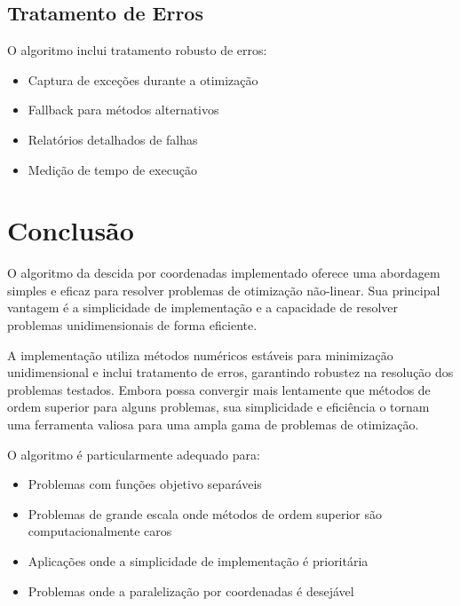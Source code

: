 \documentclass[12pt]{article}
\begin{document}
\subsection{Tratamento de Erros}

O algoritmo inclui tratamento robusto de erros:

\begin{itemize}
    \item Captura de exceções durante a otimização
    \item Fallback para métodos alternativos
    \item Relatórios detalhados de falhas
    \item Medição de tempo de execução
\end{itemize}

\section{Conclusão}

O algoritmo da descida por coordenadas implementado oferece uma abordagem simples e eficaz para resolver problemas de otimização não-linear. Sua principal vantagem é a simplicidade de implementação e a capacidade de resolver problemas unidimensionais de forma eficiente.

A implementação utiliza métodos numéricos estáveis para minimização unidimensional e inclui tratamento de erros, garantindo robustez na resolução dos problemas testados. Embora possa convergir mais lentamente que métodos de ordem superior para alguns problemas, sua simplicidade e eficiência o tornam uma ferramenta valiosa para uma ampla gama de problemas de otimização.

O algoritmo é particularmente adequado para:
\begin{itemize}
    \item Problemas com funções objetivo separáveis
    \item Problemas de grande escala onde métodos de ordem superior são computacionalmente caros
    \item Aplicações onde a simplicidade de implementação é prioritária
    \item Problemas onde a paralelização por coordenadas é desejável
\end{itemize}
\end{document}
